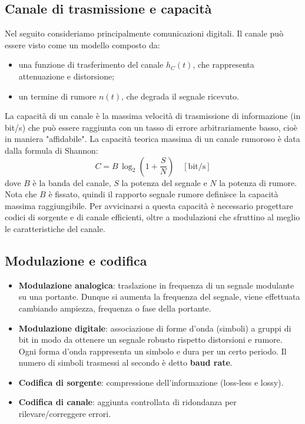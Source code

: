 \subsection{Canale di trasmissione e capacità}
Nel seguito consideriamo principalmente comunicazioni digitali. Il canale può essere visto come un modello composto da:
\begin{itemize}
\item una funzione di trasferimento del canale $h_C(t)$, che rappresenta attenuazione e distorsione;
\item un termine di rumore $n(t)$, che degrada il segnale ricevuto.
\end{itemize}
La capacità di un canale è la massima velocità di trasmissione di informazione (in bit/s) che può essere raggiunta con un tasso di errore arbitrariamente basso, cioè in maniera "affidabile".
La capacità teorica massima di un canale rumoroso è data dalla formula di Shannon:
\[
C = B\,\log_2\!\left(1 + \frac{S}{N}\right) \quad [\text{bit/s}]
\]
dove $B$ è la banda del canale, $S$ la potenza del segnale e $N$ la potenza di rumore.
Nota che $B$ è fissato, quindi il rapporto segnale rumore definisce la capacità massima raggiungibile. Per avvicinarsi a questa capacità è necessario progettare codici di sorgente e di canale efficienti, oltre a modulazioni che sfruttino al meglio le caratteristiche del canale.
\subsection{Modulazione e codifica}
\begin{itemize}
\item \textbf{Modulazione analogica}: traslazione in frequenza di un segnale modulante su una portante. Dunque si aumenta la frequenza del segnale, viene effettuata cambiando ampiezza, frequenza o fase della portante.
\item \textbf{Modulazione digitale}: associazione di forme d'onda (simboli) a gruppi di bit in modo da ottenere un segnale robusto rispetto distorsioni e rumore.
	Ogni forma d'onda rappresenta un simbolo e dura per un certo periodo. Il numero di simboli trasmessi al secondo è detto \textbf{baud rate}.

\item \textbf{Codifica di sorgente}: compressione dell'informazione (loss-less e lossy).
\item \textbf{Codifica di canale}: aggiunta controllata di ridondanza per rilevare/correggere errori.
\end{itemize}

